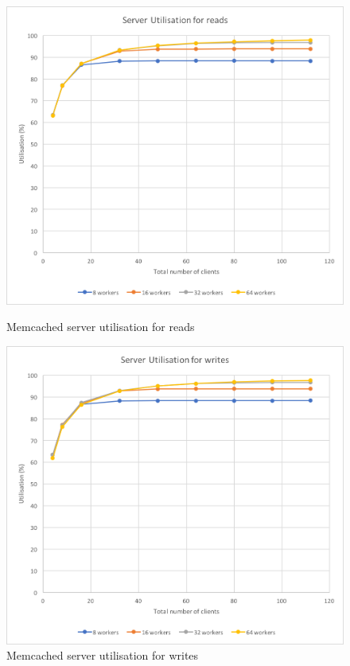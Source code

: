 \documentclass[11pt,a4paper]{article}
\begin{document}
\begin{figure}[!h]
    \centering
    \begin{minipage}[b]{.45\textwidth}
        \centering
        \includegraphics[width=\textwidth]{processing/graphics/q_network_svr_util_1mw_reads.png}
        \caption{Memcached server utilisation for reads}
        \label{png::q_network_svr_util_1mw_reads}
    \end{minipage}
    \qquad
    \begin{minipage}[b]{.45\textwidth}
        \centering
        \includegraphics[width=\textwidth]{processing/graphics/q_network_svr_util_1mw_writes.png}
        \caption{Memcached server utilisation for writes}
        \label{png::q_network_svr_util_1mw_writes}
    \end{minipage}
\end{figure}
\end{document}
